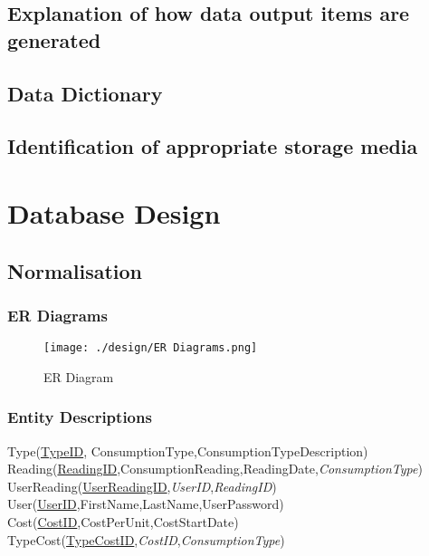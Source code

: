 \subsection{Explanation of how data output items are generated}

\subsection{Data Dictionary}

\subsection{Identification of appropriate storage media}

\section{Database Design}

\subsection{Normalisation}

\subsubsection{ER Diagrams}
\begin{figure}[H]
\texttt{[image: ./design/ER Diagrams.png]}
\caption{ER Diagram}
\end{figure}

\subsubsection{Entity Descriptions}
Type(\underline{TypeID}, ConsumptionType,ConsumptionTypeDescription) \\
Reading(\underline{ReadingID},ConsumptionReading,ReadingDate,\emph{ConsumptionType}) \\
UserReading(\underline{UserReadingID},\emph{UserID},\emph{ReadingID}) \\
User(\underline{UserID},FirstName,LastName,UserPassword) \\
Cost(\underline{CostID},CostPerUnit,CostStartDate) \\
TypeCost(\underline{TypeCostID},\emph{CostID},\emph{ConsumptionType})\\

